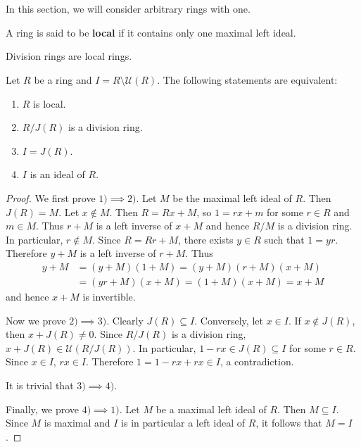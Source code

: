 \chapter{}


In this section, we will consider arbitrary rings with one. 

\begin{definition}
    A ring is said to be \textbf{local} if it contains only one maximal left ideal. 
\end{definition}

Division rings are local rings. 


\begin{theorem}
\label{thm:local}
    Let $R$ be a ring and $I=R\setminus\mathcal{U}(R)$. The following
    statements are equivalent:
    \begin{enumerate}
        \item $R$ is local.
        \item $R/J(R)$ is a division ring.
        \item $I=J(R)$.
        \item $I$ is an ideal of $R$.
    \end{enumerate}
\end{theorem}

\begin{proof}
    We first prove $1)\implies2)$. Let $M$ be the maximal left ideal of $R$. Then $J(R)=M$. 
    Let $x\not\in M$. Then $R=Rx+M$, so $1=rx+m$ for some $r\in R$ and $m\in M$. Thus  
    $r+M$ is a left inverse of $x+M$ and hence $R/M$ is a division ring. In particular, 
    $r\not\in M$. Since $R=Rr+M$, there exists $y\in R$ such that $1=yr$. Therefore
    $y+M$ is a left inverse of $r+M$. Thus 
    \begin{align*}
    y+M&=(y+M)(1+M)=(y+M)(r+M)(x+M)\\
    &=(yr+M)(x+M)=(1+M)(x+M)=x+M
    \end{align*}
    and hence $x+M$ is invertible. 

    Now we prove $2)\implies3)$. Clearly $J(R)\subseteq I$. 
    Conversely, let $x\in I$. If $x\not\in J(R)$, then
    $x+J(R)\ne 0$. Since $R/J(R)$ is a division ring, 
    $x+J(R)\in\mathcal{U}(R/J(R))$. In particular,  
    $1-rx\in J(R)\subseteq I$ for some $r\in R$. Since $x\in I$, 
    $rx\in I$. Therefore $1=1-rx+rx\in I$, a contradiction. 
    
    It is trivial that $3)\implies4)$. 

    Finally, we prove $4)\implies 1)$. 
    Let $M$ be a maximal left ideal of $R$. Then $M\subseteq I$. Since $M$ 
    is maximal and $I$ is in particular a left ideal of $R$, 
    it follows that $M=I$. 
\end{proof}

